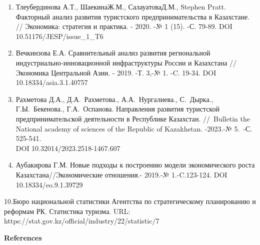 \begin{references}
\begin{enumerate}
\def\labelenumi{\arabic{enumi}.}
\setcounter{enumi}{5}
\item
  Тлеубердинова А.Т., ШаекинаЖ.М., СалауатоваД.М., Stephen Pratt.
  Факторный анализ развития туристского предпринимательства в
  Казахстане. // Экономика: стратегия и практика. - 2020. -№ 1 (15). -С.
  79-89. DOI 10.51176/JESP/issue\_1\_T6
\item
  Вечкинзова Е.А. Сравнительный анализ развития региональной
  индустриально-инновационной инфраструктуры России и Казахстана //
  Экономика Центральной Азии. - 2019. -Т. 3,-№ 1. -C. 19-34. DOI
  10.18334/asia.3.1.40757
\item
  Рахметова Д.А., Д.А.~Рахметова., А.А.~Нургалиева., С.~Дырка.,
  Г.Ы.~Бекенова., Г.А.~Оспанова. Направления развития туристской
  предпринимательской деятельности в Республике Казахстан. //~Bulletin
  the National academy of sciences of the Republic of Kazakhstan.
  -2023.-№ 5.~-С. 525-541. \\DOI 10.32014/2023.2518-1467.607
\item
  Аубакирова Г.М. Новые подходы к построению модели экономического роста
  Казахстана//Экономические отношения.- 2019.-№ 1.-C.123-124. DOI
  10.18334/eo.9.1.39729
\end{enumerate}

10.Бюро национальной статистики Агентства по стратегическому
планированию и реформам РК. Статистика туризма. URL:
{https://stat.gov.kz/official/industry/22/statistic/7}

\end{references}

\begin{center}
{\bfseries References}
\end{center}

